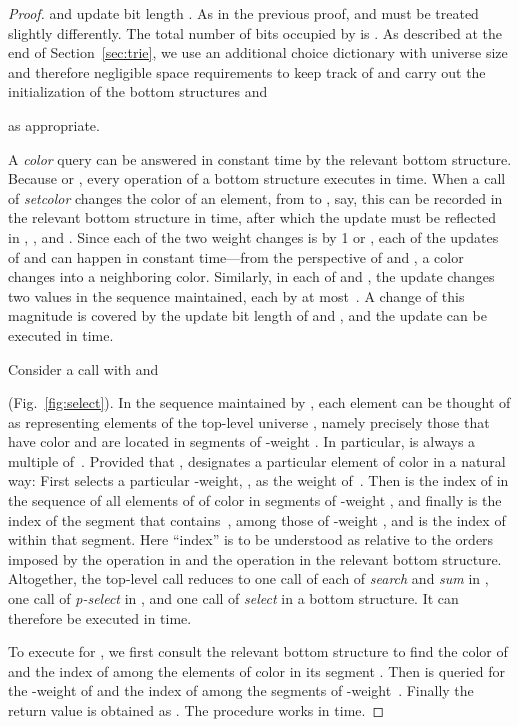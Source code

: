 \documentclass[envcountsame,envcountsect,undated,nolinenumbers]{lnthi}
\def\Tvn#1{\hbox{\textit{#1\/}}}
\begin{document}
\begin{proof}
and update bit length
.
As in the previous proof,  and  must
be treated slightly differently.
The total number of
bits occupied by
 is
.
As described at the end of Section~\ref{sec:trie},
we use an additional choice dictionary  with
universe size  and therefore
negligible space requirements to keep track
of and carry out the initialization of
the bottom structures and

as appropriate.

A \Tvn{color} query can be answered in
constant time by the relevant bottom structure.
Because  or ,
every operation of a bottom structure
executes in  time.
When a call of \Tvn{setcolor} changes the
color of an element, from  to , say,
this can be recorded in the relevant
bottom structure in  time, after which
the update must be reflected in ,
,  and .
Since each of the two weight changes is
by 1 or , 
each of the updates of  and 
can happen in constant time---from the
perspective of  and ,
a color changes into a neighboring color.
Similarly, in each of  and ,
the update changes two values in the sequence
maintained, each by at most~.
A change of this magnitude is covered by the
update bit length of  and ,
and the update can be executed
in  time.

Consider a call 
with  and

(Fig.~\ref{fig:select}).
In the sequence  maintained
by , each element  can be thought of
as representing  elements of the top-level
universe , namely precisely those
that have color  and
are located in segments of -weight .
In particular,  is always a multiple of~.
Provided that ,
 designates a particular element 
of color  in a natural way:
First  selects
a particular -weight, , as the weight of~.
Then  is the index of
 in the sequence of all elements of 
of color  in segments of -weight , and finally
 is the index of the segment that contains~,
among those of -weight ,
and  is the index of 
within that segment.
Here ``index'' is to be understood as relative
to the orders imposed by the operation
 in  and the
operation  in the
relevant bottom structure.
Altogether, the top-level call
 reduces to one call of
each of \Tvn{search} and \Tvn{sum} in ,
one call of \Tvn{p-select} in , and one
call of \Tvn{select} in a bottom structure.
It can therefore be executed in  time.

To execute  for
, we first consult the relevant
bottom structure to find the color 
of  and the index  of 
among the elements of color  in its segment .
Then  is queried for the -weight  of  
and the index  of  among the segments
of -weight~.
Finally the return value is obtained as
.
The procedure works in  time.


\end{proof}
\end{document}
